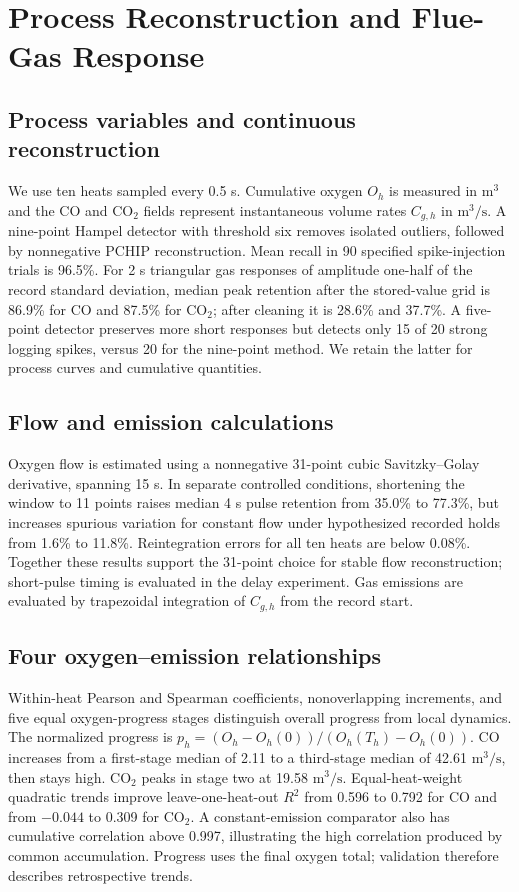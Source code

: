 \section{Process Reconstruction and Flue-Gas Response}
\subsection{Process variables and continuous reconstruction}
We use ten heats sampled every 0.5 s. Cumulative oxygen $O_h$ is measured in $\mathrm{m^3}$ and the CO and CO$_2$ fields represent instantaneous volume rates $C_{g,h}$ in $\mathrm{m^3/s}$. A nine-point Hampel detector with threshold six removes isolated outliers, followed by nonnegative PCHIP reconstruction. Mean recall in 90 specified spike-injection trials is 96.5\%. For 2 s triangular gas responses of amplitude one-half of the record standard deviation, median peak retention after the stored-value grid is 86.9\% for CO and 87.5\% for CO$_2$; after cleaning it is 28.6\% and 37.7\%. A five-point detector preserves more short responses but detects only 15 of 20 strong logging spikes, versus 20 for the nine-point method. We retain the latter for process curves and cumulative quantities.
\subsection{Flow and emission calculations}
Oxygen flow is estimated using a nonnegative 31-point cubic Savitzky--Golay derivative, spanning 15 s. In separate controlled conditions, shortening the window to 11 points raises median 4 s pulse retention from 35.0\% to 77.3\%, but increases spurious variation for constant flow under hypothesized recorded holds from 1.6\% to 11.8\%. Reintegration errors for all ten heats are below 0.08\%. Together these results support the 31-point choice for stable flow reconstruction; short-pulse timing is evaluated in the delay experiment. Gas emissions are evaluated by trapezoidal integration of $C_{g,h}$ from the record start.
\subsection{Four oxygen--emission relationships}
Within-heat Pearson and Spearman coefficients, nonoverlapping increments, and five equal oxygen-progress stages distinguish overall progress from local dynamics. The normalized progress is $p_h=(O_h-O_h(0))/(O_h(T_h)-O_h(0))$. CO increases from a first-stage median of 2.11 to a third-stage median of 42.61 $\mathrm{m^3/s}$, then stays high. CO$_2$ peaks in stage two at 19.58 $\mathrm{m^3/s}$. Equal-heat-weight quadratic trends improve leave-one-heat-out $R^2$ from 0.596 to 0.792 for CO and from $-0.044$ to 0.309 for CO$_2$. A constant-emission comparator also has cumulative correlation above 0.997, illustrating the high correlation produced by common accumulation. Progress uses the final oxygen total; validation therefore describes retrospective trends.
